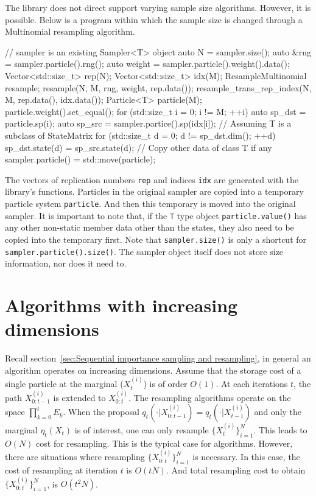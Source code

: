 The library does not direct support varying sample size algorithms. However, it
is possible. Below is a program within which the sample size is changed through
a Multinomial resampling algorithm.
\begin{cppcode}
  // sampler is an existing Sampler<T> object
  auto N = sampler.size();
  auto &rng = sampler.particle().rng();
  auto weight = sampler.particle().weight().data();
  Vector<std::size_t> rep(N);
  Vector<std::size_t> idx(M);
  ResampleMultinomial resample;
  resample(N, M, rng, weight, rep.data());
  resample_trans_rep_index(N, M, rep.data(), idx.data());
  Particle<T> particle(M);
  particle.weight().set_equal();
  for (std::size_t i = 0; i != M; ++i) {
      auto sp_dst = particle.sp(i);
      auto sp_src = sampler.partice().sp(idx[i]);
      // Assuming T is a subclass of StateMatrix
      for (std::size_t d = 0; d != sp_dst.dim(); ++d)
          sp_dst.state(d) = sp_src.state(d);
  }
  // Copy other data of class T if any
  sampler.particle() = std::move(particle);
\end{cppcode}
The vectors of replication numbers \verb|rep| and indices \verb|idx| are
generated with the library's functions. Particles in the original sampler are
copied into a temporary particle system \verb|particle|. And then this
temporary is moved into the original sampler. It is important to note that, if
the \verb|T| type object \verb|particle.value()| has any other non-static
member data other than the states, they also need to be copied into the
temporary first. Note that \verb|sampler.size()| is only a shortcut for
\verb|sampler.particle().size()|. The sampler object itself does not store size
information, nor does it need to.

\section{Algorithms with increasing dimensions}
\label{sec:Algorithms with increasing dimensions}

Recall section~\ref{sec:Sequential importance sampling and resampling}, in
general an \sis algorithm operates on increasing dimensions. Assume that the
storage cost of a single particle at the marginal ($X_t^{(i)}$) is of order
$O(1)$. At each iterations $t$, the path $X_{0:t-1}^{(i)}$ is extended to
$X_{0:t}^{(i)}$. The resampling algorithms operate on the space
$\prod_{k=0}^tE_k$. When the proposal $q_t(\cdot|X_{0:t-1}^{(i)}) =
q_t(\cdot|X_{t-1}^{(i)})$ and only the marginal $\eta_t(X_t)$ is of interest,
one can only resample $\{X_t^{(i)}\}_{i=1}^N$. This leads to $O(N)$ cost for
resampling. This is the typical case for \smc algorithms. However, there are
situations where resampling $\{X_{0:t}^{(i)}\}_{i=1}^N$ is necessary. In this
case, the cost of resampling at iteration $t$ is $O(tN)$. And total resampling
cost to obtain $\{X_{0:t}^{(i)}\}_{i=1}^N$, is $O(t^2N)$.

